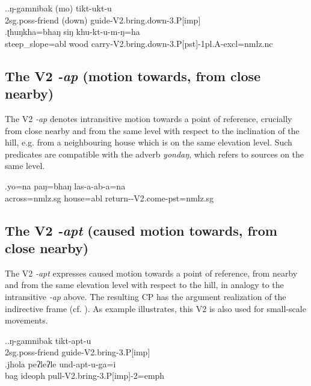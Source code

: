 \ex.\ag.ŋ-gamnibak (mo) tikt-ukt-u\\
{\sc 2sg.poss-}friend (down) guide{\sc -V2.bring.down-3.P[imp]}\\
\bg.ʈhuŋkha=bhaŋ siŋ khu-kt-u-m-ŋ=ha\\
steep\_slope{\sc =abl} wood carry{\sc -V2.bring.down-3.P[pst]-1pl.A-excl=nmlz.nc}\\


\subsection{The V2 \emph{-ap} (motion towards, from close nearby)} \label{V2-come}

The V2 \emph{-ap}  denotes intransitive motion towards a point of reference, crucially from close nearby and from the same  level with respect to the inclination of the hill, e.g. from a neighbouring house which is on the same elevation level. Such predicates are compatible with the adverb \emph{yondaŋ}, which refers to sources on the same level.

\exg.yo=na paŋ=bhaŋ las-a-ab-a=na\\
across{\sc =nmlz.sg} house{\sc =abl} return-{\sc [3sg]-V2.come-pst=nmlz.sg}\\


\subsection{The V2 \emph{-apt} (caused motion towards, from close nearby)} \label{V2-bring}%

The V2 \emph{-apt}   expresses caused motion towards  a point of reference, from nearby and from the same elevation level with respect to the hill, in analogy to the intransitive \emph{-ap} above. The resulting CP has the argument realization of the indirective frame (cf. ). As example \Next[b] illustrates, this V2 is also used for small-scale movements.

\ex.\ag.ŋ-gamnibak tikt-apt-u\\
{\sc 2sg.poss-}friend  guide{\sc -V2.bring-3.P[imp]}\\
\bg.jhola peʔleʔle und-apt-u-ga=i\\
bag {\sc ideoph} pull{\sc -V2.bring-3.P[imp]-2=emph}\\



